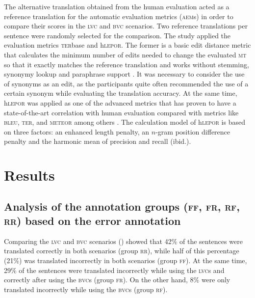 \documentclass[output=paper]{langsci/langscibook}
\begin{document}
The alternative translation obtained from the human evaluation acted as a reference translation for the automatic evaluation metrics (\textsc{aem}s) in order to compare their scores in the \textsc{lvc} and \textsc{bvc} scenarios. Two reference translations per sentence were randomly selected for the comparison. The study applied the evaluation metrics \textsc{ter}base and h\textsc{lepor}. The former is a basic edit distance metric that calculates the minimum number of edits needed to change the evaluated \textsc{mt} so that it exactly matches the reference translation and works without stemming, synonymy lookup and paraphrase support \citep{Snover2006,Gonzalez2014}. It was necessary to consider the use of synonyms as an edit, as the participants quite often recommended the use of a certain synonym while evaluating the translation accuracy. At the same time, h\textsc{lepor} was applied as one of the advanced metrics that has proven to have a state-of-the-art correlation with human evaluation compared with metrics like \textsc{bleu}, \textsc{ter}, and \textsc{meteor} among others \citep{Han2013}. The calculation model of h\textsc{lepor} is based on three factors: an enhanced length penalty, an $n$-gram position difference penalty and the harmonic mean of precision and recall (ibid.).


\section{Results}\label{marzouk:res}

\subsection{Analysis of the annotation groups (\textsc{ff}, \textsc{fr}, \textsc{rf}, \textsc{rr}) based on the error annotation}


Comparing the \textsc{lvc} and \textsc{bvc} scenarios () showed that 42\% of the sentences were translated correctly in both scenarios (group \textsc{rr}), while half of this percentage (21\%) was translated incorrectly in both scenarios (group \textsc{ff}). At the same time, 29\% of the sentences were translated incorrectly while using the \textsc{lvc}s and correctly after using the \textsc{bvc}s (group \textsc{fr}). On the other hand, 8\% were only translated incorrectly while using the \textsc{bvc}s (group \textsc{rf}).
\end{document}
